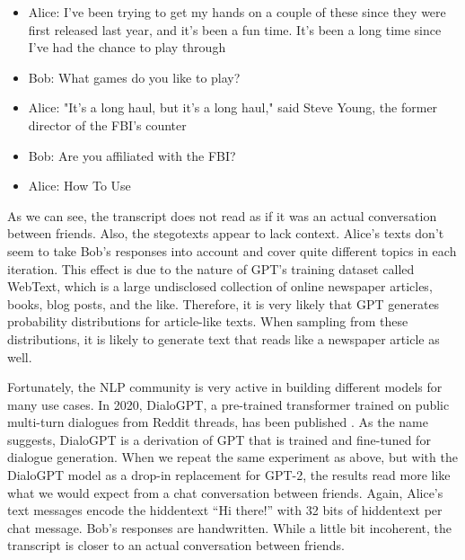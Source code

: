 \begin{example}
\leavevmode
\begin{itemize}
\item Alice: I've been trying to get my hands on a couple of these since they were first released last year, and it's been a fun time. It's been a long time since I've had the chance to play through
\item Bob: What games do you like to play?
\item Alice: "It's a long haul, but it's a long haul," said Steve Young, the former director of the FBI's counter
\item Bob: Are you affiliated with the FBI?
\item Alice: How To Use
\end{itemize}
\end{example}

As we can see, the transcript does not read as if it was an actual conversation between friends.
Also, the stegotexts appear to lack context.
Alice's texts don't seem to take Bob's responses into account and cover quite different topics in each iteration.
This effect is due to the nature of GPT's training dataset called WebText, which is a large undisclosed collection of online newspaper articles, books, blog posts, and the like.
Therefore, it is very likely that GPT generates probability distributions for article-like texts.
When sampling from these distributions, it is likely to generate text that reads like a newspaper article as well.

Fortunately, the NLP community is very active in building different models for many use cases.
In 2020, DialoGPT, a pre-trained transformer trained on public multi-turn dialogues from Reddit threads, has been published \cite{Zhang2020}.
As the name suggests, DialoGPT is a derivation of GPT that is trained and fine-tuned for dialogue generation.
When we repeat the same experiment as above, but with the DialoGPT model as a drop-in replacement for GPT-2, the results read more like what we would expect from a chat conversation between friends.
Again, Alice's text messages encode the hiddentext ``Hi there!'' with 32 bits of hiddentext per chat message.
Bob's responses are handwritten.
While a little bit incoherent, the transcript is closer to an actual conversation between friends.

